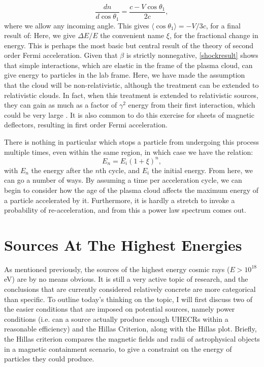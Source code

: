 $$\frac{dn}{d\cos\theta_1}=\frac{c-V\cos\theta_1}{2c},$$
where we allow any incoming angle. This gives $\langle\cos\theta_1\rangle=-V/3c$, for a final result of:
Here, we give $\Delta E/E$ the convenient name $\xi$, for the fractional change in energy. This is perhaps the most basic but central result of the theory of second order Fermi acceleration. Given that $\beta$ is strictly nonnegative, \autoref{shockresult} shows that simple interactions, which are elastic in the frame of the plasma cloud, can give energy to particles in the lab frame. Here, we have made the assumption that the cloud will be non-relativistic, although the treatment can be extended to relativistic clouds. In fact, when this treatment is extended to relativistic sources, they can gain as much as a factor of $\gamma^2$ energy from their first interaction, which could be very large \cite{shocks}. It is also common to do this exercise for sheets of magnetic deflectors, resulting in first order Fermi acceleration. 

There is nothing in particular which stops a particle from undergoing this process multiple times, even within the same region, in which case we have the relation:
$$E_n=E_i(1+\xi)^n,$$
with $E_n$ the energy after the $n$th cycle, and $E_i$ the initial energy. From here, we can go a number of ways. By assuming a time per acceleration cycle, we can begin to consider how the age of the plasma cloud affects the maximum energy of a particle accelerated by it. Furthermore, it is hardly a stretch to invoke a probability of re-acceleration, and from this a power law spectrum comes out.  

\section{Sources At The Highest Energies}\label{sources} %
As mentioned previously, the sources of the highest energy cosmic rays ($E>10^{18}$eV) are by no means obvious. It is still a very active topic of research, and the conclusions that are currently considered relatively concrete are more categorical than specific. To outline today's thinking on the topic, I will first discuss two of the easier conditions that are imposed on potential sources, namely power conditions (i.e. can a source actually produce enough UHECRs within a reasonable efficiency) and the Hillas Criterion, along with the Hillas plot. Briefly, the Hillas criterion compares the magnetic fields and radii of astrophysical objects in a magnetic containment scenario, to give a constraint on the energy of particles they could produce. 

